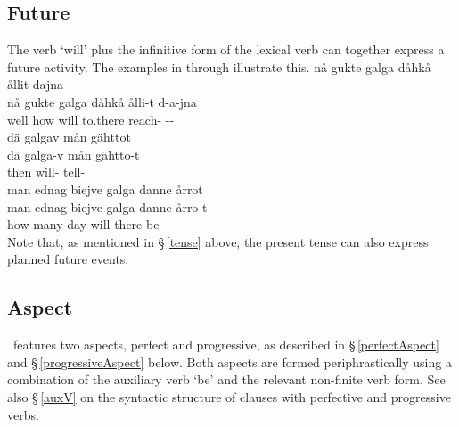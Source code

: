 \subsection{Future}\label{futureTense}
The verb  ‘will’ plus the infinitive form of the lexical verb can together express a future activity. The examples in  through  illustrate this.
\ea\label{futureTenseEx1}%
\glll	nå gukte galga dåhkå ållit dajna\\
	nå gukte galga dåhkå ålli-t d-a-jna\\
	well how will\BS{} to.there reach- --\\\nopagebreak
{}	
\z
\ea\label{futureTenseEx2}%
\glll	dä galgav mån gähttot\\
	dä galga-v mån gähtto-t\\
	then will-  tell-\\\nopagebreak
{}	
\z
\ea\label{futureTenseEx3}%
\glll	man ednag biejve galga danne årrot\\
	man ednag biejve galga danne årro-t\\
	how many day\BS{} will\BS{} there be-\\\nopagebreak
{}	
\z
Note that, as mentioned in §\,\ref{tense} above, the present tense can also express planned future events. 

\subsection{Aspect}\label{aspect}
\PS\ features two aspects, perfect and progressive, as described in §\,\ref{perfectAspect} and §\,\ref{progressiveAspect} below. Both aspects are formed periphrastically using a combination of the auxiliary verb  ‘be’ and the relevant non-finite verb form. 
See also §\,\ref{auxV} on the syntactic structure of clauses with perfective and progressive verbs. 

